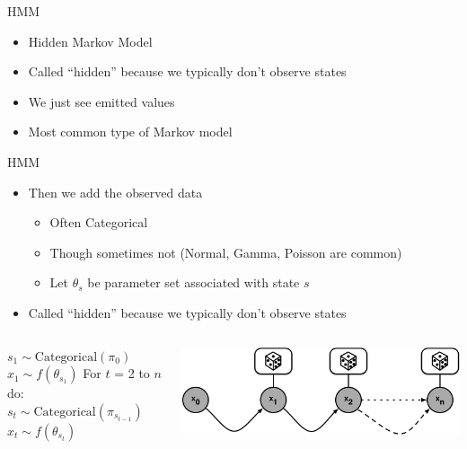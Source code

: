 \documentclass[aspectratio=169]{beamer}
\begin{document}
\begin{frame}{HMM}

\begin{itemize}
\item Hidden Markov Model
\item Called ``hidden'' because we typically don't observe states
\item We just see emitted values
\item Most common type of Markov model
\end{itemize}
\end{frame}
\begin{frame}[fragile]{HMM}

\begin{itemize}
\item Then we add the observed data
	\begin{itemize}
	\item Often Categorical
	\item Though sometimes not (Normal, Gamma, Poisson are common)
	\item Let $\theta_s$ be parameter set associated with state $s$
	\end{itemize}
\item Called ``hidden'' because we typically don't observe states
\end{itemize}
\begin{columns}
\begin{column}{0.4\textwidth}
\begin{SQL}
$s_1 \sim \textrm{Categorical}(\pi_0)$
$x_1 \sim f(\theta_{s_1})$
For $t$ = 2 to $n$ do:
  $s_t \sim \textrm{Categorical}(\pi_{s_{t - 1}})$
  $x_t \sim f(\theta_{s_{t}})$
\end{SQL}
\end{column}
\begin{column}{0.6\textwidth}
\includegraphics[width=1\textwidth]{lectSeq/autoregressiveCat.pdf}
\end{column}
\end{columns}

\end{frame}
\end{document}
